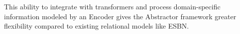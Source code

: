 This ability to integrate with transformers and process domain-specific information modeled by an Encoder gives the Abstractor framework greater flexibility compared to existing relational models like ESBN.


%
%
%
%
%

